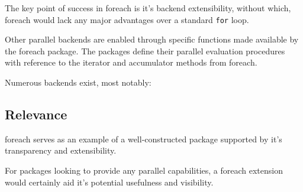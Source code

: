 The key point of success in foreach is it's backend extensibility,
without which, foreach would lack any major advantages over a standard
\texttt{for} loop.

Other parallel backends are enabled through specific functions made
available by the foreach package. The packages define their parallel
evaluation procedures with reference to the iterator and accumulator
methods from foreach.

Numerous backends exist, most notably:


\hypertarget{relevance}{%
	\subsection{Relevance}\label{relevance}}

foreach serves as an example of a well-constructed package supported by
it's transparency and extensibility.

For packages looking to provide any parallel capabilities, a foreach
extension would certainly aid it's potential usefulness and visibility.
